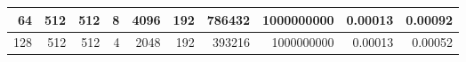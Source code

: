 \documentclass[journal,transmag]{IEEEtran}
\begin{document}
\begin{table}[h]
\begin{tabular}{|r|r|r|r|r|r|r|r|r|r|}
		64                          & 512                        & 512                         & 8                               & 4096                                 & 192                                  & 786432                                 & 1000000000                            & 0.00013                         & 0.00092                       \\ \hline
		128                         & 512                        & 512                         & 4                               & 2048                                 & 192                                  & 393216                                 & 1000000000                            & 0.00013                         & 0.00052                       \\ \hline
	\end{tabular}
\end{table}

	\newpage
	
\end{document}
